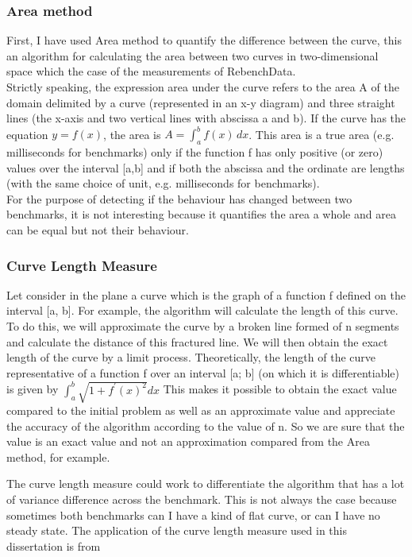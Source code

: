\documentclass{article}
\begin{document}
\subsubsection{Area method}

First, I have used Area \citep{jekel2019similarity} method to quantify the difference between the curve, this an algorithm for calculating the area between two curves in two-dimensional space which the case of the measurements of RebenchData.\\
Strictly speaking, the expression area under the curve refers to the area A of the domain delimited by a curve (represented in an x-y diagram) and three straight lines (the x-axis and two vertical lines with abscissa a and b). If the curve has the equation $y=f(x)$, the area is $A=\int _{a}^{b}f(x)\, {d} x$. This area is a true area (e.g. milliseconds for benchmarks) only if the function f has only positive (or zero) values over the interval [a,b] and if both the abscissa and the ordinate are lengths (with the same choice of unit, e.g. milliseconds for benchmarks).\\
For the purpose of detecting if the behaviour has changed between two benchmarks, it is not interesting because it quantifies the area a whole and area can be equal but not their behaviour.

\subsubsection{Curve Length Measure}


Let consider in the plane a curve \citep{moran1966measuring} which is the graph of a function f defined on the interval [a, b]. For example, the algorithm will calculate the length of this curve. To do this, we will approximate the curve by a broken line formed of n segments and calculate the distance of this fractured line. We will then obtain the exact length of the curve by a limit process.
Theoretically, the length of the curve representative of a function f over an interval [a; b] (on which it is differentiable) is given by $\int_{a}^{b} \sqrt{1+f^{\prime}(x)^{2}} d x$
This makes it possible to obtain the exact value compared to the initial problem as well as an approximate value and appreciate the accuracy of the algorithm according to the value of n. So we are sure that the value is an exact value and not an approximation compared from the Area method, for example.

The curve length measure could work to differentiate the algorithm that has a lot of variance difference across the benchmark. This is not always the case because sometimes both benchmarks can I have a kind of flat curve, or can I have no steady state.
The application of the curve length measure used in this dissertation is from \citep{jekel2019similarity}
\end{document}

